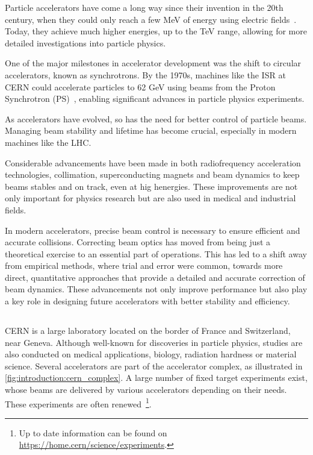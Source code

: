 Particle accelerators have come a long way since their invention in the 20th century, when they
could only reach a few MeV of energy using electric fields~\cite{bryant_brief_1994}. Today, they
achieve much higher energies, up to the TeV range, allowing for more detailed investigations into
particle physics.

One of the major milestones in accelerator development was the shift to circular accelerators, known
as synchrotrons. By the 1970s, machines like the ISR at CERN could accelerate particles to 62 GeV
using beams from the Proton Synchrotron (PS)~\cite{philip_cerns_2011}, enabling significant advances
in particle physics experiments.

As accelerators have evolved, so has the need for better control of particle beams. Managing beam
stability and lifetime has become crucial, especially in modern machines like the LHC. 

Considerable advancements have been made in both radiofrequency acceleration technologies,
collimation, superconducting magnets and beam dynamics to keep beams stables and on track, even at
hig henergies. These improvements are not only important for physics research but are also used in
medical and industrial fields.

In modern accelerators, precise beam control is necessary to ensure efficient and accurate
collisions. Correcting beam optics has moved from being just a theoretical exercise to an essential
part of operations. This has led to a shift away from empirical methods, where trial and error were
common, towards more direct, quantitative approaches that provide a detailed and accurate correction
of beam dynamics. These advancements not only improve performance but also play a key role in
designing future accelerators with better stability and efficiency.


\subsection{}

CERN is a large laboratory located on the border of France and Switzerland, near Geneva. Although
well-known for discoveries in particle physics, studies are also conducted on medical applications,
biology, radiation hardness or material science.
Several accelerators are part of the accelerator complex, as illustrated in
\cref{fig:introduction:cern_complex}. A large number of fixed target experiments exist, whose
beams are delivered by various accelerators depending on their needs. These experiments are often
renewed~\footnote{Up to date information can be found on
\href{https://home.cern/science/experiments}{https://home.cern/science/experiments}.}.


